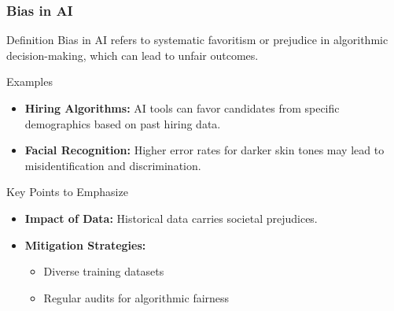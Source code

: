 \documentclass{beamer}
\begin{document}
\begin{frame}[fragile]
    \frametitle{Bias in AI}
    \begin{block}{Definition}
        Bias in AI refers to systematic favoritism or prejudice in algorithmic decision-making, which can lead to unfair outcomes.
    \end{block}
    
    \begin{block}{Examples}
        \begin{itemize}
            \item \textbf{Hiring Algorithms:} AI tools can favor candidates from specific demographics based on past hiring data.
            \item \textbf{Facial Recognition:} Higher error rates for darker skin tones may lead to misidentification and discrimination.
        \end{itemize}
    \end{block}

    \begin{block}{Key Points to Emphasize}
        \begin{itemize}
            \item \textbf{Impact of Data:} Historical data carries societal prejudices.
            \item \textbf{Mitigation Strategies:} 
                \begin{itemize}
                    \item Diverse training datasets
                    \item Regular audits for algorithmic fairness
                \end{itemize}
        \end{itemize}
    \end{block}
\end{frame}
\end{document}
